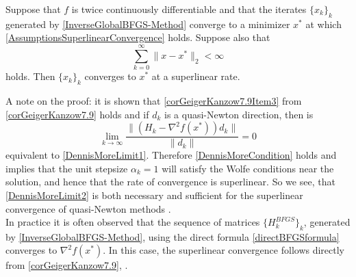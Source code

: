 \begin{theorem}\label{SuperlinearConvergence}
    Suppose that $f$ is twice continuously differentiable and that the iterates $\{ x_k \}_k$ generated by \cref{InverseGlobalBFGS-Method} converge to a minimizer $x^*$ at which \cref{AssumptionsSuperlinearConvergence} holds. Suppose also that
    \begin{equation}\label{SumSuperlinearConvergence}
        \sum^{\infty}_{k=0} \lVert x - x^* \rVert_2 < \infty
    \end{equation}
    holds. Then $\{ x_k \}_k$ converges to $x^*$ at a superlinear rate.
\end{theorem}

A note on the proof: it is shown that \cref{corGeigerKanzow7.9Item3} from \cref{corGeigerKanzow7.9} holds and if $d_k$ is a quasi-Newton direction, then is 
\begin{equation}\label{DennisMoreLimit2}
    \lim_{k \to \infty} \frac{\lVert (H_k - \nabla^2 f(x^*)) d_k \rVert}{\lVert d_k \rVert} = 0
\end{equation}
equivalent to \cref{DennisMoreLimit1}. Therefore \cref{DennisMoreCondition} holds and implies that the unit stepsize $\alpha_k = 1$ will satisfy the Wolfe conditions near the solution, and hence that the rate of convergence is superlinear. So we see, that \cref{DennisMoreLimit2} is both necessary and sufficient for the superlinear convergence of quasi-Newton methods \cite[p.~47]{NocedalWright:2006}. \\
In practice it is often observed that the sequence of matrices $\{ H^{BFGS}_k \}_k$, generated by \cref{InverseGlobalBFGS-Method}, using the direct formula \cref{directBFGSformula} converges to $\nabla^2 f(x^*)$. In this case, the superlinear convergence follows directly from \cref{corGeigerKanzow7.9}, \cite[p.~167-168]{GeigerKanzow:1999}. \\



